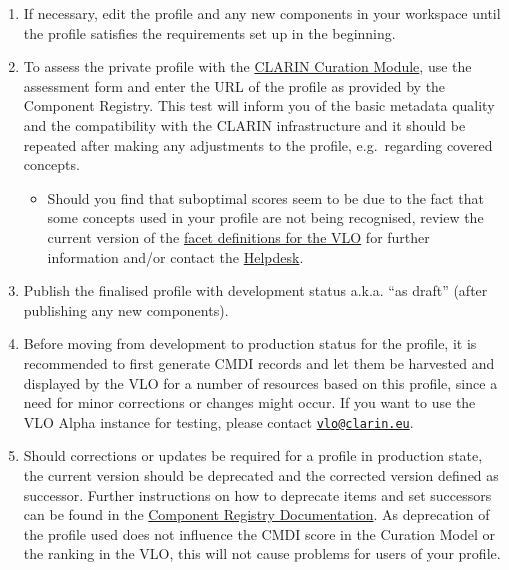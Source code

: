 \begin{enumerate}
\item
  If necessary, edit the profile and any new components in your
  workspace until the profile satisfies the requirements set up in the beginning.

\item
  To assess the private profile with the
  \href{https://clarin.oeaw.ac.at/curate/}{CLARIN Curation Module}, use the assessment form and enter the URL of the profile as provided by the Component Registry. This test will inform you of the basic metadata quality and the compatibility with the CLARIN infrastructure and it should be repeated after making any adjustments to the profile,  e.g.~regarding covered concepts.

\begin{itemize}
\tightlist
\item
  Should you find that suboptimal scores seem to be due to the fact that some concepts used in your profile are not being recognised, review the current version of the
  \href{https://github.com/clarin-eric/VLO/blob/master/vlo-commons/src/main/resources/facetConcepts.xml}{facet
  definitions for the VLO} for further information and/or contact the \href{mailto:vlo@clarin.eu}{Helpdesk}.
\end{itemize}

\item
  Publish the finalised profile with development status a.k.a. ``as draft'' (after publishing any new components).
\item
  Before moving from development to production status for the profile, it is recommended to first generate CMDI records and let them be harvested and displayed by the VLO for a number of resources based on this profile, since a need for minor corrections or changes might occur. If you want to use the VLO Alpha instance for testing, please contact \href{mailto:vlo@clarin.eu}{\nolinkurl{vlo@clarin.eu}}.
\item
  Should corrections or updates be required for a profile in production state, the current version should be deprecated and the corrected version defined as successor. Further instructions on how to deprecate items and set successors can be found in the \href{https://www.clarin.eu/content/component-registry-documentation}{Component Registry Documentation}. As deprecation of the profile used does not influence the CMDI score in the Curation Model or the ranking in the VLO, this will not cause problems for users of your profile.
\end{enumerate}

